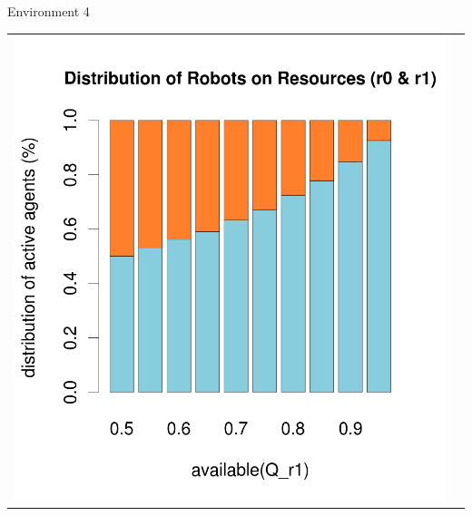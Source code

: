 \documentclass[8pt, handout=show,notes=show]{beamer}
\begin{document}
\begin{frame}{Environment 4}
\begin{table}[H]
\begin{tabular}{cc}
\includegraphics[width=\imgSize]{../images/5StaticEnv/barplotAliveR1AndR2_median_env4_normalized}
\end{tabular}
\end{table}
\end{frame}
\end{document}
